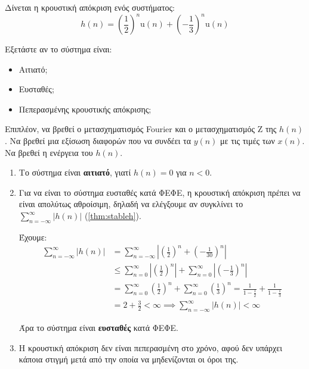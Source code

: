 \documentclass[11pt,a4paper,notitlepage,fleqn]{article}
\begin{document}
\begin{exercise}
	Δίνεται η κρουστική απόκριση ενός συστήματος:
	\[
	h(n) = \left(\frac{1}{2}\right)^n \mathrm{u}(n) + \left(-\frac{1}{3}\right)^n \mathrm{u}(n)
	\]
	
	Εξετάστε αν το σύστημα είναι:
	\begin{itemize}
		\item Αιτιατό;
		\item Ευσταθές;
		\item Πεπερασμένης κρουστικής απόκρισης;
	\end{itemize}

   Επιπλέον, να βρεθεί ο μετασχηματισμός Fourier και ο μετασχηματισμός Z της \( h(n) \). Να βρεθεί μια εξίσωση διαφορών που να συνδέει τα \( y(n) \) με τις τιμές των \( x(n) \). Να βρεθεί η ενέργεια
   του \( h(n) \).

    \tcblower
    \begin{enumerate}
    	\item Το σύστημα είναι \textbf{αιτιατό}, γιατί \( h(n) = 0 \) για \( n<0 \).
    	\item Για να είναι το σύστημα ευσταθές κατά ΦΕΦΕ, η κρουστική απόκριση πρέπει να είναι απολύτως αθροίσιμη, δηλαδή να ελέγξουμε αν συγκλίνει το \( \sum_{n=-\infty}^{\infty} \left|h(n)\right| \) (\autoref{thm:stableh}).
    	
    	Έχουμε:
    	\begin{align*}
    		\sum_{n=-\infty}^{\infty} \left|h(n)\right|
    		&= \sum_{n=-\infty}^{\infty}\left| \left(\frac{1}{2}\right)^n + \left(-\frac{1}{30}\right)^{n}
    		\right|
    		\\ &\leq \sum_{n=0}^{\infty} \left|\left(\frac{1}{2}\right)^n\right|
    		+ \sum_{n=0}^{\infty} \left|
    		\left(-\frac{1}{3}\right)^n
    		\right|
    		\\ &= \sum_{n=0}^{\infty} \left(\frac{1}{2}\right)^n
    		+ \sum_{n=0}^{\infty} \left(\frac{1}{3}\right)^n
    		= \frac{1}{1-\frac{1}{2}}+\frac{1}{1-\frac{1}{3}}
    		\\ &= 2+\frac{3}{2} < \infty \implies \sum_{n=-\infty}^{\infty} \left|h(n)\right|<\infty
    	\end{align*}
    	
    	Άρα το σύστημα είναι \textbf{ευσταθές} κατά ΦΕΦΕ.
    	\item
    	Η κρουστική απόκριση δεν είναι πεπερασμένη στο χρόνο, αφού δεν υπάρχει κάποια στιγμή μετά από
    	την οποία να μηδενίζονται οι όροι της.
    	

\end{enumerate}
\end{exercise}
\end{document}

